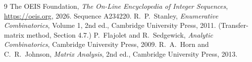 \documentclass[11pt,a4paper]{article}
\theoremstyle{plain}
\theoremstyle{definition}
\begin{document}
\begin{thebibliography}{9}
 The OEIS Foundation, \emph{The On-Line Encyclopedia of Integer
Sequences}, \url{https://oeis.org}, 2026. Sequence A234220.
 R.~P.~Stanley, \emph{Enumerative Combinatorics}, Volume 1, 2nd ed.,
Cambridge University Press, 2011. (Transfer-matrix method, Section 4.7.)
 P.~Flajolet and R.~Sedgewick, \emph{Analytic Combinatorics}, Cambridge
University Press, 2009.
 R.~A.~Horn and C.~R.~Johnson, \emph{Matrix Analysis}, 2nd ed., Cambridge
University Press, 2013.
\end{thebibliography}
\end{document}
